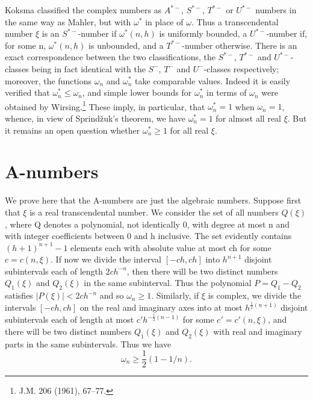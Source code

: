 Koksma classified the complex numbers as  $A^{*-}$, $S^{*-}$, $T^{*-}$ or $U^{*-}$ numbers in the same way as Mahler, but with  $\omega^{*}$  in place of  $\omega$. Thus a transcendental number  $\xi$  is an  $S^{*-}$-number if  $\omega^{*}(n,h)$  is uniformly bounded, a  $U^{*-}$-number if, for some n,  $\omega^{*}(n,h)$  is unbounded, and a  $T^{*-}$-number otherwise. There is an exact correspondence between the two classifications, the  $S^{*-}$, $T^{*-}$ and $U^{*-}$-classes being in fact identical with the  $S^{-}$, $T^{-}$ and $U^{-}$-classes respectively; moreover, the functions  $\omega_{n}$  and  $\omega_{n}^{*}$  take comparable values. Indeed it is easily verified that  $\omega_{n}^{*} \leq \omega_{n}$, and simple lower bounds for  $\omega_{n}^{*}$  in terms of  $\omega_{n}$  were obtained by Wirsing.\footnote{J.M. 206 (1961), 67--77.} These imply, in particular, that  $\omega_{n}^{*} = 1$  when  $\omega_{n} = 1$, whence, in view of Sprindžuk's theorem, we have  $\omega_{n}^{*} = 1$  for almost all real  $\xi$. But it remains an open question whether  $\omega_{n}^{*} \geqslant 1$  for all real  $\xi$.

\section{A-numbers}\label{sec:ch8_2}

We prove here that the A-numbers are just the algebraic numbers. Suppose first that  $\xi$  is a real transcendental number. We consider the set of all numbers  $Q(\xi)$, where Q denotes a polynomial, not identically 0, with degree at most n and with integer coefficients between 0 and h inclusive. The set evidently contains  $(h+1)^{n+1}-1$  elements each with absolute value at most ch for some  $c = c(n, \xi)$. If now we divide the interval  $[-ch, ch]$  into  $h^{n+1}$  disjoint subintervals each of length  $2ch^{-n}$, then there will be two distinct numbers  $Q_1(\xi)$  and  $Q_2(\xi)$  in the same subinterval. Thus the polynomial  $P = Q_1 - Q_2$  satisfies  $|P(\xi)| < 2ch^{-n}$  and so  $\omega_n \ge 1$. Similarly, if  $\xi$  is complex, we divide the intervals $[-ch, ch]$ on the real and imaginary axes into at most  $h^{\frac{1}{2}(n+1)}$  disjoint subintervals each of length at most  $c'h^{-\frac{1}{2}(n-1)}$  for some  $c' = c'(n, \xi)$, and there will be two distinct numbers  $Q_1(\xi)$  and  $Q_2(\xi)$  with real and imaginary parts in the same subintervals. Thus we have
\[\omega_n \geqslant \frac{1}{2}(1-1/n).\]

